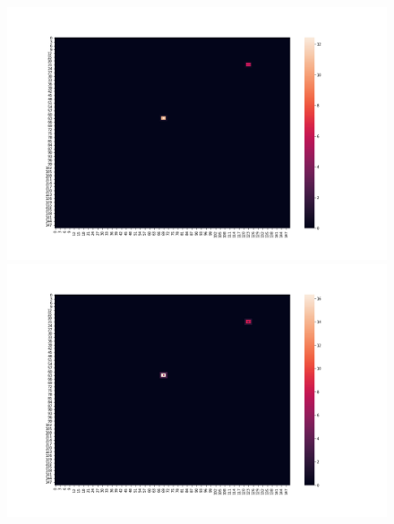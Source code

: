 \documentclass[a4paper]{article}
\begin{document}
\begin{figure}[ht]
  \includegraphics[scale=0.15]{../quarantine/quarantine_heatmap_2.png}
  \centering
  \includegraphics[scale=0.15]{../quarantine/quarantine_heatmap_3.png}
  \centering
\end{figure}
\end{document}
